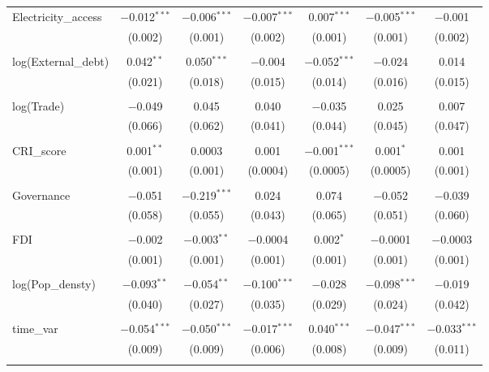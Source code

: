 \begin{table}[!htbp]
\begin{tabular}{@{\extracolsep{-3pt}}lcccccc}
 Electricity\_access & $-$0.012$^{***}$ & $-$0.006$^{***}$ & $-$0.007$^{***}$ & 0.007$^{***}$ & $-$0.005$^{***}$ & $-$0.001 \\ 
  & (0.002) & (0.001) & (0.002) & (0.001) & (0.001) & (0.002) \\ 
  & & & & & & \\ 
 log(External\_debt) & 0.042$^{**}$ & 0.050$^{***}$ & $-$0.004 & $-$0.052$^{***}$ & $-$0.024 & 0.014 \\ 
  & (0.021) & (0.018) & (0.015) & (0.014) & (0.016) & (0.015) \\ 
  & & & & & & \\ 
 log(Trade) & $-$0.049 & 0.045 & 0.040 & $-$0.035 & 0.025 & 0.007 \\ 
  & (0.066) & (0.062) & (0.041) & (0.044) & (0.045) & (0.047) \\ 
  & & & & & & \\ 
 CRI\_score & 0.001$^{**}$ & 0.0003 & 0.001 & $-$0.001$^{***}$ & 0.001$^{*}$ & 0.001 \\ 
  & (0.001) & (0.001) & (0.0004) & (0.0005) & (0.0005) & (0.001) \\ 
  & & & & & & \\ 
 Governance & $-$0.051 & $-$0.219$^{***}$ & 0.024 & 0.074 & $-$0.052 & $-$0.039 \\ 
  & (0.058) & (0.055) & (0.043) & (0.065) & (0.051) & (0.060) \\ 
  & & & & & & \\ 
 FDI & $-$0.002 & $-$0.003$^{**}$ & $-$0.0004 & 0.002$^{*}$ & $-$0.0001 & $-$0.0003 \\ 
  & (0.001) & (0.001) & (0.001) & (0.001) & (0.001) & (0.001) \\ 
  & & & & & & \\ 
 log(Pop\_densty) & $-$0.093$^{**}$ & $-$0.054$^{**}$ & $-$0.100$^{***}$ & $-$0.028 & $-$0.098$^{***}$ & $-$0.019 \\ 
  & (0.040) & (0.027) & (0.035) & (0.029) & (0.024) & (0.042) \\ 
  & & & & & & \\ 
 time\_var & $-$0.054$^{***}$ & $-$0.050$^{***}$ & $-$0.017$^{***}$ & 0.040$^{***}$ & $-$0.047$^{***}$ & $-$0.033$^{***}$ \\ 
  & (0.009) & (0.009) & (0.006) & (0.008) & (0.009) & (0.011) \\ 
  & & & & & & \\ 
 

\end{tabular}
\end{table}
